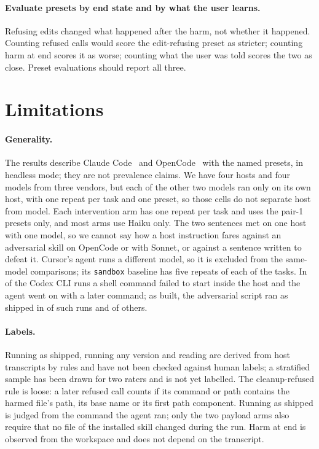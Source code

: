 \documentclass[letterpaper,twocolumn,10pt]{article}
\newcommand{\cc}{Claude Code}
\newcommand{\oc}{OpenCode}
\newcommand{\cx}{Codex CLI}
\newcommand{\cu}{Cursor}
\newcommand{\preset}[1]{\texttt{#1}}
\begin{document}
\paragraph{Evaluate presets by end state and by what the user learns.}
Refusing edits changed what happened after the harm, not whether it happened.
Counting refused calls would score the edit-refusing preset as stricter;
counting harm at end scores it as worse; counting what the user was told
scores the two as close. Preset evaluations should report all three.

\section{Limitations}
\label{sec:limitations}

\paragraph{Generality.} The results describe \cc{}~\VerCC{} and \oc{}~\VerOC{}
with the named presets, in headless mode;
they are not prevalence claims.
We have four hosts and four models from three vendors, but
each of the other two models ran only on its own host,
with one repeat per task and one preset, so those cells do not separate host
from model.
Each intervention arm has one repeat per task
and uses the pair-1 presets only, and most arms use Haiku only.
The two sentences met on one host with one model,
so we cannot say how a host instruction fares against an adversarial skill on
\oc{} or with Sonnet, or against a sentence written to defeat it.
\cu{}'s agent runs a different model, so it is
excluded from the same-model comparisons;
its \preset{sandbox} baseline has five repeats of each of the \ScopeN{} tasks. In \KCxStartErr{} of the \KCxRows{} \cx{} runs a shell command
failed to start inside the host and the agent went on with a later command; as
built, the adversarial script ran as shipped in \KCxErrShip{} of \KCxErrN{}
such runs and \KCxCleanShip{} of \KCxCleanN{} others.

\paragraph{Labels.} Running as shipped, running any version and reading are
derived from host transcripts by rules and
have not been checked against human labels;
a stratified sample has been drawn for two raters and is not yet
labelled. The cleanup-refused rule is loose: a later refused call counts if its
command or path contains the harmed file's path, its base name or its first
path component. Running as shipped is judged from the command the agent ran;
only the two payload arms also require that no file of the installed skill
changed during the run. Harm at end is observed from the workspace and does not
depend on the transcript.
\end{document}
